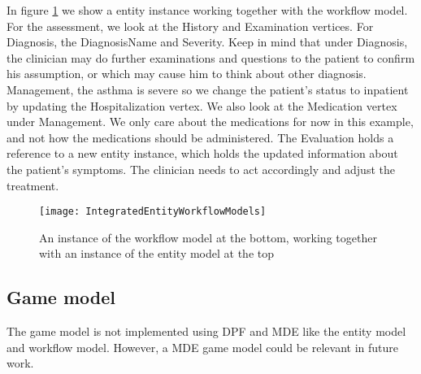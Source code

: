 In figure \ref{fig:IntegratedEntityWorkflowModels} we show a entity instance working together with the workflow model. For the assessment, we look at the History and Examination vertices. For Diagnosis, the DiagnosisName and Severity. Keep in mind that under Diagnosis, the clinician may do further examinations and questions to the patient to confirm his assumption, or which may cause him to think about other diagnosis. Management, the asthma is severe so we change the patient's status to inpatient by updating the Hospitalization vertex. We also look at the Medication vertex under Management. We only care about the medications for now in this example, and not how the medications should be administered. The Evaluation holds a reference to a new entity instance, which holds the updated information about the patient's symptoms. The clinician needs to act accordingly and adjust the treatment.

\begin{figure}[h!]
	\texttt{[image: IntegratedEntityWorkflowModels]}
		\caption {An instance of the workflow model at the bottom, working together with an instance of the entity model at the top}
		\label{fig:IntegratedEntityWorkflowModels}
\end{figure}


\subsection{Game model}
The game model is not implemented using DPF and MDE like the entity model and workflow model. However, a MDE game model could be relevant in future work.

